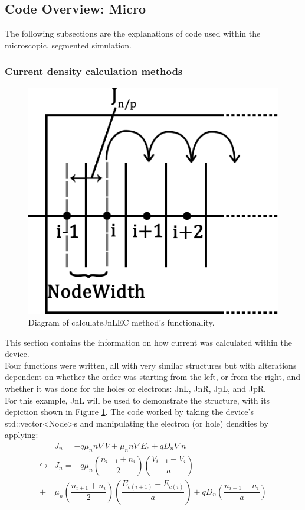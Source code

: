 \documentclass[titlepage]{article}
\begin{document}
\subsection{Code Overview: Micro}
The following subsections are the explanations of code used within the microscopic, segmented simulation.
\subsubsection{Current density calculation methods}
\begin{figure}[h]
	\centering
	\includegraphics[scale=0.2]{Figures/JnL}
	\caption{\label{fig:Mic:JnL} Diagram of calculateJnLEC method's functionality.}
\end{figure}
This section contains the information on how current was calculated within the device.\\ Four functions were written, all with very similar structures but with alterations dependent on whether the order was starting from the left, or from the right, and whether it was done for the holes or electrons: JnL, JnR, JpL, and JpR. \\
For this example, JnL will be used to demonstrate the structure, with its depiction shown in Figure \ref{fig:Mic:JnL}.
The code worked by taking the device's std::vector<Node>s and manipulating the electron (or hole) densities by applying:
\begin{eqnarray}
	&J_n = -q\mu_n n\nabla V + \mu_n n \nabla E_c + q D_n \nabla n\\
		\hookrightarrow &J_n = -q\mu_n(\dfrac{n_{i+1}+n_{i}}{2})(\dfrac{V_{i+1}-V_{i}}{a})\\
	+& \mu_n (\dfrac{n_{i+1}+n_{i}}{2})(\dfrac{E_{c(i+1)}-E_{c(i)}}{a}) + qD_n(\dfrac{n_{i+1}-n_{i}}{a}) \\
\end{eqnarray}
\end{document}
